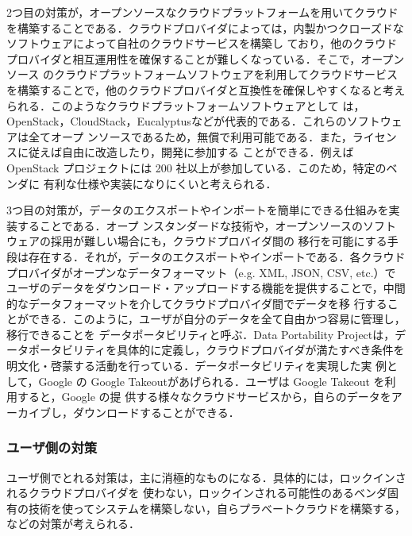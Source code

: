 2つ目の対策が，オープンソースなクラウドプラットフォームを用いてクラウドを構築することである．クラウドプロバイダによっては，内製かつクローズドなソフトウェアによって自社のクラウドサービスを構築し ており，他のクラウドプロバイダと相互運用性を確保することが難しくなっている．そこで，オープンソース のクラウドプラットフォームソフトウェアを利用してクラウドサービスを構築することで，他のクラウドプロバイダと互換性を確保しやすくなると考えられる．このようなクラウドプラットフォームソフトウェアとして は，OpenStack\cite{openstack}，CloudStack\cite{cloudstack}，Eucalyptus\cite{eucalyptus}などが代表的である．これらのソフトウェアは全てオープ ンソースであるため，無償で利用可能である．また，ライセンスに従えば自由に改造したり，開発に参加する ことができる．例えば OpenStack プロジェクトには 200 社以上が参加している．このため，特定のベンダに 有利な仕様や実装になりにくいと考えられる．

3つ目の対策が，データのエクスポートやインポートを簡単にできる仕組みを実装することである．オープ ンスタンダードな技術や，オープンソースのソフトウェアの採用が難しい場合にも，クラウドプロバイダ間の 移行を可能にする手段は存在する．それが，データのエクスポートやインポートである．各クラウドプロバイダがオープンなデータフォーマット（e.g. XML, JSON, CSV, etc.）でユーザのデータをダウンロード・アップロードする機能を提供することで，中間的なデータフォーマットを介してクラウドプロバイダ間でデータを移 行することができる．このように，ユーザが自分のデータを全て自由かつ容易に管理し，移行できることを データポータビリティと呼ぶ．Data Portability Project\cite{dataportability}は，データポータビリティを具体的に定義し，クラウドプロバイダが満たすべき条件を明文化・啓蒙する活動を行っている．データポータビリティを実現した実 例として，Google の Google Takeout\cite{takeout}があげられる．ユーザは Google Takeout を利用すると，Google の提 供する様々なクラウドサービスから，自らのデータをアーカイブし，ダウンロードすることができる．

\subsubsection{ユーザ側の対策}

ユーザ側でとれる対策は，主に消極的なものになる．具体的には，ロックインされるクラウドプロバイダを
使わない，ロックインされる可能性のあるベンダ固有の技術を使ってシステムを構築しない，自らプラベートクラウドを構築する，などの対策が考えられる．
